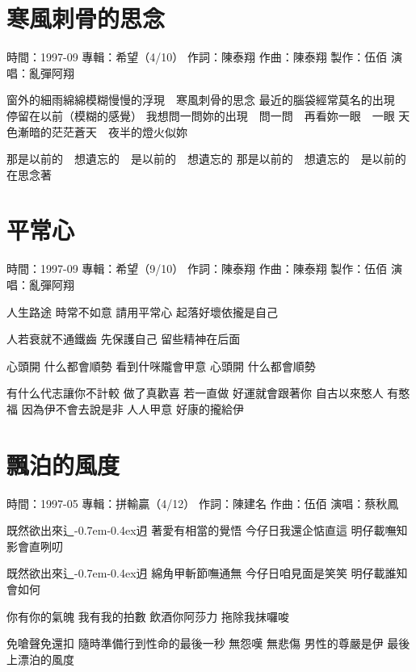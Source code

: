 \documentclass[UTF8,a4paper,oneside,twocolumn,12pt]{ctexbook}
\newcommand{\infopair}[2]{\textbullet #1：#2}
\newcommand{\zc}[1][伍佰]{\infopair{作詞}{#1}}
\newcommand{\zq}[1][伍佰]{\infopair{作曲}{#1}}
\newcommand{\zj}[1]{\infopair{專輯}{#1}}
\newcommand{\zz}[1]{\infopair{製作}{#1}}
\newcommand{\sj}[1]{\infopair{時間}{#1}}
\newcommand{\tshittho}{\hbox{辶\kern-0.7em\lower-0.4ex\hbox{\scalebox{0.7}{日}}}迌}
\newenvironment{info}{\begin{flushleft}\kaishu
	}
	{\end{flushleft}\normalsize\yahei\par}
\newenvironment{lyric}{
	}
{}
\begin{document}
\section{寒風刺骨的思念}
\begin{info}
	\sj{1997-09}
	\zj{希望（4/10）}
	\zc[陳泰翔]
	\zq[陳泰翔]
	\zz{伍佰}
	\infopair{演唱}{亂彈阿翔}
\end{info}
\begin{lyric}
	窗外的細雨綿綿模糊慢慢的浮現　寒風刺骨的思念
	最近的腦袋經常莫名的出現　停留在以前（模糊的感覺）
	我想問一問妳的出現　問一問　再看妳一眼　一眼
	天色漸暗的茫茫蒼天　夜半的燈火似妳

	那是以前的　想遺忘的　是以前的　想遺忘的
	那是以前的　想遺忘的　是以前的　在思念著
\end{lyric}

\section{平常心}
\begin{info}
	\sj{1997-09}
	\zj{希望（9/10）}
	\zc[陳泰翔]
	\zq[陳泰翔]
	\zz{伍佰}
	\infopair{演唱}{亂彈阿翔}
\end{info}
\begin{lyric}
	人生路途 時常不如意 請用平常心
	起落好壞依攏是自己

	人若衰就不通鐵齒 先保護自己
	留些精神在后面

	心頭開 什么都會順勢
	看到什咪隴會甲意
	心頭開 什么都會順勢

	有什么代志讓你不計較 做了真歡喜
	若一直做 好運就會跟著你
	自古以來憨人 有憨福
	因為伊不會去說是非 人人甲意
	好康的攏給伊
\end{lyric}

\section{飄泊的風度}
\begin{info}
	\sj{1997-05}
	\zj{拼輸贏（4/12）}
	\zc[陳建名]
	\zq
	\infopair{演唱}{蔡秋鳳}
\end{info}
\begin{lyric}
	既然欲出來\tshittho{} 著愛有相當的覺悟
	今仔日我還企惦直這 明仔載嘸知影會直咧叨

	既然欲出來\tshittho{} 綿角甲斬節嘸通無
	今仔日咱見面是笑笑 明仔載誰知會如何

	你有你的氣魄 我有我的拍數
	飲酒你阿莎力 拖除我抹囉唆

	免嗆聲免還扣 隨時準備行到性命的最後一秒
	無怨嘆 無悲傷
	男性的尊嚴是伊 最後上漂泊的風度
\end{lyric}
\end{document}
